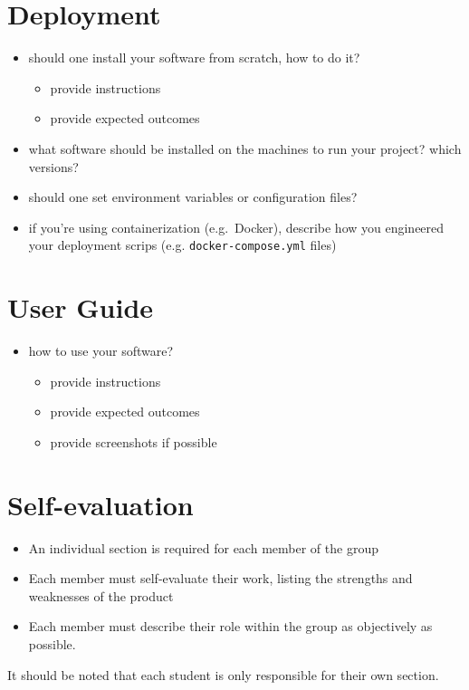 \documentclass{scrartcl}
\begin{document}
\section{Deployment}\label{deployment}

\begin{itemize}
  \item should one install your software from scratch, how to do it?

  \begin{itemize}
    \item provide instructions
    \item provide expected outcomes
  \end{itemize}

  \item what software should be installed on the machines to run your project? which versions?
  
  \item should one set environment variables or configuration files?
  
  \item if you're using containerization (e.g.~Docker), 
  describe how you engineered your deployment scrips (e.g. \texttt{docker-compose.yml} files)
\end{itemize}

\section{User Guide}\label{user-guide}

\begin{itemize}
  \item how to use your software?

  \begin{itemize}
    \item provide instructions
    \item provide expected outcomes
    \item provide screenshots if possible
  \end{itemize}
\end{itemize}

\section{Self-evaluation}\label{self-evaluation}

\begin{itemize}
  \item An individual section is required for each member of the group
  \item Each member must self-evaluate their work, listing the strengths and weaknesses of the product
  \item Each member must describe their role within the group as objectively as possible.
\end{itemize}

It should be noted that each student is only responsible for their own section.



\end{document}
